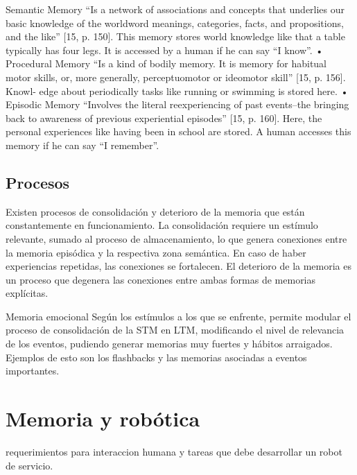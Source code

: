 Semantic Memory “Is a network of associations and concepts that underlies our basic knowledge of the
worldword meanings, categories, facts, and propositions, and the like” [15, p. 150]. This memory stores world knowledge like that a table typically has four legs. It is accessed by a human if he can say “I know”.
• Procedural Memory “Is a kind of bodily memory. It is memory for habitual motor skills, or, more generally,
perceptuomotor or ideomotor skill” [15, p. 156]. Knowl- edge about periodically tasks like running or swimming is stored here.
• Episodic Memory “Involves the literal reexperiencing of past events–the bringing back to awareness of previous
experiential episodes” [15, p. 160]. Here, the personal experiences like having been in school are stored. A human accesses this memory if he can say “I remember”.


\subsection{Procesos}

Existen procesos de consolidaci\'on y deterioro de la memoria que est\'an constantemente en funcionamiento. La consolidaci\'on requiere un est\'imulo relevante, sumado al proceso de almacenamiento, lo que genera conexiones entre la memoria epis\'odica y la respectiva zona sem\'antica. En caso de haber experiencias repetidas, las conexiones se fortalecen. El deterioro de la memoria es un proceso que degenera las conexiones entre ambas formas de memorias expl\'icitas.

Memoria emocional Seg\'un los est\'imulos a los que se enfrente, permite modular el proceso de consolidaci\'on de la STM en LTM, modificando el nivel de relevancia de los eventos, pudiendo generar memorias muy fuertes y h\'abitos arraigados. Ejemplos de esto son los flashbacks y las memorias asociadas a eventos importantes.



\section{Memoria y rob\'otica}

requerimientos para interaccion humana y tareas que debe desarrollar un robot de servicio.
%

